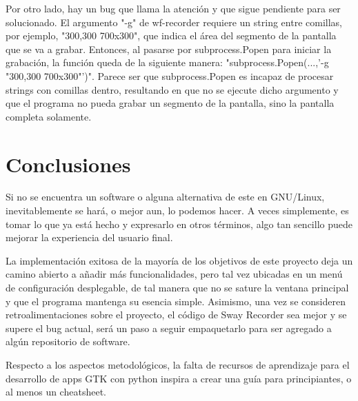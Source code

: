\documentclass[conference]{IEEEtran}
\begin{document}
Por otro lado, hay un bug que llama la atención y que sigue pendiente para ser solucionado. El argumento "-g" de wf-recorder requiere un string entre comillas, por ejemplo, "300,300 700x300", que indica el área del segmento de la pantalla que se va a grabar. Entonces, al pasarse por subprocess.Popen para iniciar la grabación, la función queda de la siguiente manera: "subprocess.Popen(...,'-g "300,300 700x300"')". Parece ser que subprocess.Popen es incapaz de procesar strings con comillas dentro,
resultando en que no se ejecute dicho argumento y que el programa no pueda grabar un segmento de la pantalla, sino la pantalla completa solamente.

\section{Conclusiones}
Si no se encuentra un software o alguna alternativa de este en GNU/Linux, inevitablemente se hará, o mejor aun, lo podemos hacer. A veces simplemente, es tomar lo que ya está hecho y expresarlo en otros términos, algo tan sencillo puede mejorar la experiencia del usuario final.

La implementación exitosa de la mayoría de los objetivos de este proyecto deja un camino abierto a añadir más funcionalidades, pero tal vez ubicadas en un menú de configuración desplegable, de tal manera que no se sature la ventana principal y que el programa mantenga su esencia simple. Asimismo, una vez se consideren retroalimentaciones sobre el proyecto, el código de Sway Recorder sea mejor y se supere el bug actual, será un paso a seguir empaquetarlo para ser agregado a algún repositorio de software.

Respecto a los aspectos metodológicos, la falta de recursos de aprendizaje para el desarrollo de apps GTK con python inspira a crear una guía para principiantes, o al menos un cheatsheet.
\end{document}
